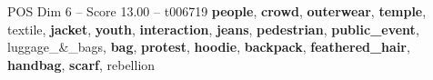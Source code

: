 \begin{textsample}{POS Dim 6 – Score 13.00 – t006719}  \label{ex:f6_pos_023}
\textbf{people}, \textbf{crowd}, \textbf{outerwear}, \textbf{temple}, textile, \textbf{jacket}, \textbf{youth}, \textbf{interaction}, \textbf{jeans}, \textbf{pedestrian}, \textbf{public\_event}, luggage\_\&\_bags, \textbf{bag}, \textbf{protest}, \textbf{hoodie}, \textbf{backpack}, \textbf{feathered\_hair}, \textbf{handbag}, \textbf{scarf}, rebellion

\end{textsample}
